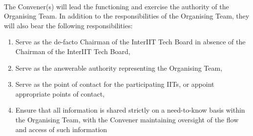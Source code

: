 \paragraph{}
The Convener(s) will lead the functioning and exercise the authority of the Organising Team. In addition to the responsibilities of the Organising Team, they will also bear the following responsibilities:
\begin{enumerate}
    \item Serve as the de-facto Chairman of the InterIIT Tech Board in absence of the Chairman of the InterIIT Tech Board,
    \item Serve as the answerable authority representing the Organising Team,
    \item Serve as the point of contact for the participating IITs, or appoint appropriate points of contact,
    \item Ensure that all information is shared strictly on a need-to-know basis within the Organising Team, with the Convener maintaining oversight of the flow and access of such information
\end{enumerate}
